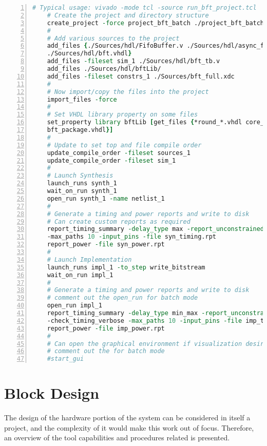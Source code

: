 \begin{lstlisting}[language=tcl, basicstyle=\scriptsize\ttfamily, tabsize=2,
	commentstyle=\color{darkgray}, keywordstyle=\color{blue}, backgroundcolor=\color{lightgray},
	morekeywords={create_project, add_files, import_files, set_property, update_compile_order,
	launch_runs, wait_on_run, open_run, report_timming_summary, report_power}, breaklines=true,
	numbers=left, float=htb,
	caption={[TCL project creation example]TCL project creation example, from \cite{UG895}},
	label={tcl-script}]
	# Typical usage: vivado -mode tcl -source run_bft_project.tcl
	# Create the project and directory structure
	create_project -force project_bft_batch ./project_bft_batch -part xc7z010-clg225-1
	#
	# Add various sources to the project
	add_files {./Sources/hdl/FifoBuffer.v ./Sources/hdl/async_fifo.v \
	./Sources/hdl/bft.vhdl}
	add_files -fileset sim_1 ./Sources/hdl/bft_tb.v
	add_files ./Sources/hdl/bftLib/
	add_files -fileset constrs_1 ./Sources/bft_full.xdc
	#
	# Now import/copy the files into the project
	import_files -force
	#
	# Set VHDL library property on some files
	set_property library bftLib [get_files {*round_*.vhdl core_transform.vhdl \
	bft_package.vhdl}]
	#
	# Update to set top and file compile order
	update_compile_order -fileset sources_1
	update_compile_order -fileset sim_1
	#
	# Launch Synthesis
	launch_runs synth_1
	wait_on_run synth_1
	open_run synth_1 -name netlist_1
	#
	# Generate a timing and power reports and write to disk
	# Can create custom reports as required
	report_timing_summary -delay_type max -report_unconstrained -check_timing_verbose \
	-max_paths 10 -input_pins -file syn_timing.rpt
	report_power -file syn_power.rpt
	#
	# Launch Implementation
	launch_runs impl_1 -to_step write_bitstream
	wait_on_run impl_1
	#
	# Generate a timing and power reports and write to disk
	# comment out the open_run for batch mode
	open_run impl_1
	report_timing_summary -delay_type min_max -report_unconstrained \
	-check_timing_verbose -max_paths 10 -input_pins -file imp_timing.rpt
	report_power -file imp_power.rpt
	#
	# Can open the graphical environment if visualization desired
	# comment out the for batch mode
	#start_gui
\end{lstlisting}

\section{Block Design}

The design of the hardware portion of the system can be considered in itself a project, and the
complexity of it would make this work out of focus. Therefore, an overview of the tool capabilities
and procedures related is presented.

